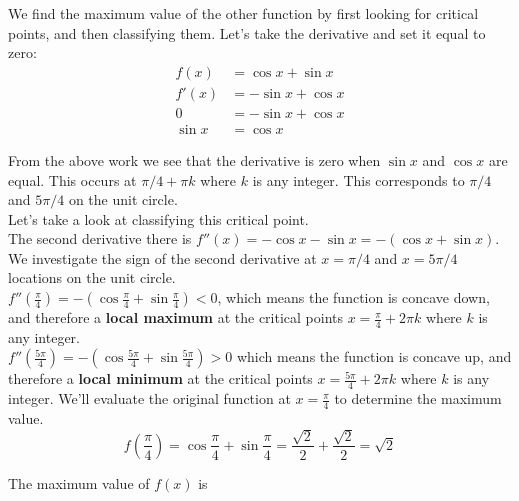 \documentclass{article}
\begin{document}
\begin{enumerate}
\begin{enumerate}
\begin{solution}
    We find the maximum value of the other function by first looking for critical points, and then classifying them. Let's take the derivative and set it equal to zero:
    \begin{align*}
        f(x)&= \cos x + \sin x \\
        f'(x) &= -\sin x + \cos x \\
        0&= -\sin x + \cos x\\
        \sin x &= \cos x
    \end{align*}

    From the above work we see that the derivative is zero when $\sin x$ and $\cos x$ are equal. This occurs at $\pi/4 + \pi k$ where $k$ is any integer. This corresponds to  $\pi/4$ and $5\pi/4$ on the unit circle.\\

    Let's take a look at classifying this critical point. \\
    The second derivative there is $f''(x) = -\cos x -\sin x=-(\cos x + \sin x)$. We investigate the sign of the second derivative at $x=\pi/4$ and $x=5\pi/4$ locations on the unit circle.\\
   $f''(\frac{\pi}{4})= -(\cos \frac{\pi}{4} + \sin\frac{\pi}{4})<0$, which means the function is concave down, and therefore a {\bf local maximum} at the critical points $x=\frac{\pi}{4}+2\pi k$ where $k$ is any integer. \\
   $f''(\frac{5\pi}{4})= -(\cos \frac{5\pi}{4} + \sin\frac{5\pi}{4})>0$ which means the function is concave up, and therefore a {\bf local minimum} at the critical points $x=\frac{5\pi}{4}+2\pi k$ where $k$ is any integer. 
   We'll evaluate the original function at $x=\frac{\pi}{4}$ to determine the maximum value. 
   $$f(\frac{\pi}{4})=\cos\frac{\pi}{4}+\sin\frac{\pi}{4}=\frac{\sqrt{2}}{2}+\frac{\sqrt{2}}{2}=\sqrt{2}$$

   The maximum value of $f(x)$ is 
\end{solution}
    \end{enumerate}
  
\end{enumerate}
\end{document}
